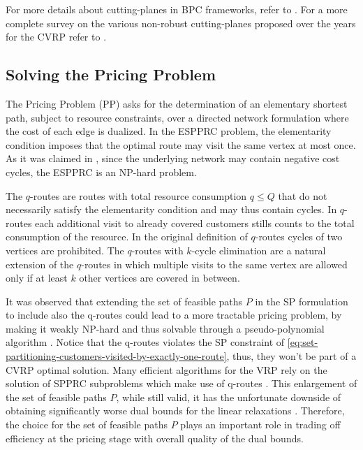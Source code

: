 For more details about cutting-planes in BPC frameworks,
refer to \textcite{desaulniers2011}.
For a more complete survey on the various non-robust cutting-planes
proposed over the years for the CVRP refer to \textcite{costa2019}.


\subsection{Solving the Pricing Problem}
\label{sec:intro-solving-the-pricing-problem}

The Pricing Problem (PP) asks for the determination of an elementary shortest path,
subject to resource constraints,
over a directed network formulation where the cost of each edge
is dualized.
In the ESPPRC problem, the elementarity condition imposes
that the optimal route may visit the same vertex at most once.
As it was claimed in \textcite{dror1994},
since the underlying network may contain negative cost cycles,
the ESPPRC is an NP-hard problem.

\medskip

The $q$-routes \parencite{christofides1981}
are routes with total resource consumption $q \le Q$
that do not necessarily satisfy the elementarity condition and may thus contain cycles.
In $q$-routes each additional visit to already covered customers
stills counts to the total consumption of the resource.
In the original definition of $q$-routes cycles of two vertices are prohibited.
The $q$-routes with $k$-cycle elimination
are a natural extension of the $q$-routes
in which multiple visits to the same vertex are allowed only
if at least $k$ other vertices are covered in between.


It was observed that extending the set of feasible paths $P$ in
the SP formulation to include also the q-routes could lead to a
more tractable pricing problem, by making it weakly NP-hard
and thus solvable through a pseudo-polynomial algorithm \parencite{desrochers1988, irnich2005}.
Notice that the q-routes violates the SP constraint of \cref{eq:set-partitioning-customers-visited-by-exactly-one-route},
thus, they won't be part of a CVRP optimal solution.
Many efficient algorithms for the VRP
rely on the solution of SPPRC subproblems which
make use of q-routes  \parencite{desrochers1992, feillet2004, fukasawa2006,contardo2011}.
This enlargement of the set of feasible paths $P$,
while still valid,
it has the unfortunate downside
of obtaining significantly worse dual bounds for the linear relaxations \parencite{feillet2004}.
Therefore, the choice for the set of feasible paths $P$ plays an important
role in trading off efficiency at the pricing stage with
overall quality of the dual bounds.


